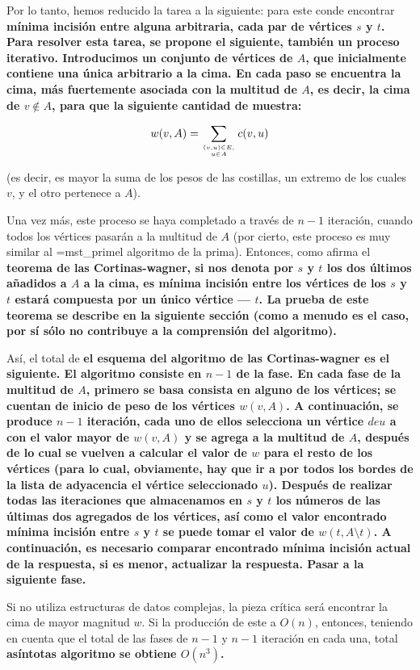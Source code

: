 Por lo tanto, hemos reducido la tarea a la siguiente: para este conde encontrar \bf{mínima incisión entre alguna arbitraria, cada par de vértices} $s$ y $t$. Para resolver esta tarea, se propone el siguiente, también un proceso iterativo. Introducimos un conjunto de vértices de $A$, que inicialmente contiene una única arbitrario a la cima. En cada paso se encuentra la cima, \bf{más fuertemente asociada} con la multitud de $A$, es decir, la cima de $v \not\in A$, para que la siguiente cantidad de muestra:

$$ w(v,A) = \sum_{(v,u) \in E, \atop u \in A} c(v,u) $$

(es decir, es mayor la suma de los pesos de las costillas, un extremo de los cuales $v$, y el otro pertenece a $A$).

Una vez más, este proceso se haya completado a través de $n-1$ iteración, cuando todos los vértices pasarán a la multitud de $A$ (por cierto, este proceso es muy similar al \algohref=mst_prim{el algoritmo de la prima}). Entonces, como afirma el \bf{teorema de las Cortinas-wagner}, si nos denota por $s$ y $t$ los dos últimos añadidos a $A$ a la cima, es mínima incisión entre los vértices de los $s$ y $t$ estará compuesta por un único vértice --- $t$. La prueba de este teorema se describe en la siguiente sección (como a menudo es el caso, por sí sólo no contribuye a la comprensión del algoritmo).

Así, el total de \bf{el esquema del algoritmo} de las Cortinas-wagner es el siguiente. El algoritmo consiste en $n-1$ de la fase. En cada fase de la multitud de $A$, primero se basa consista en alguno de los vértices; se cuentan de inicio de peso de los vértices $w(v,A)$. A continuación, se produce $n-1$ iteración, cada uno de ellos selecciona un vértice $de u$ a con el valor mayor de $w(v,A)$ y se agrega a la multitud de $A$, después de lo cual se vuelven a calcular el valor de $w$ para el resto de los vértices (para lo cual, obviamente, hay que ir a por todos los bordes de la lista de adyacencia el vértice seleccionado $u$). Después de realizar todas las iteraciones que almacenamos en $s$ y $t$ los números de las últimas dos agregados de los vértices, así como el valor encontrado mínima incisión entre $s$ y $t$ se puede tomar el valor de $w(t,A \setminus t)$. A continuación, es necesario comparar encontrado mínima incisión actual de la respuesta, si es menor, actualizar la respuesta. Pasar a la siguiente fase.

Si no utiliza estructuras de datos complejas, la pieza crítica será encontrar la cima de mayor magnitud $w$. Si la producción de este a $O(n)$, entonces, teniendo en cuenta que el total de las fases de $n-1$ y $n-1$ iteración en cada una, total \bf{asíntotas algoritmo} se obtiene $O(n^3)$.

